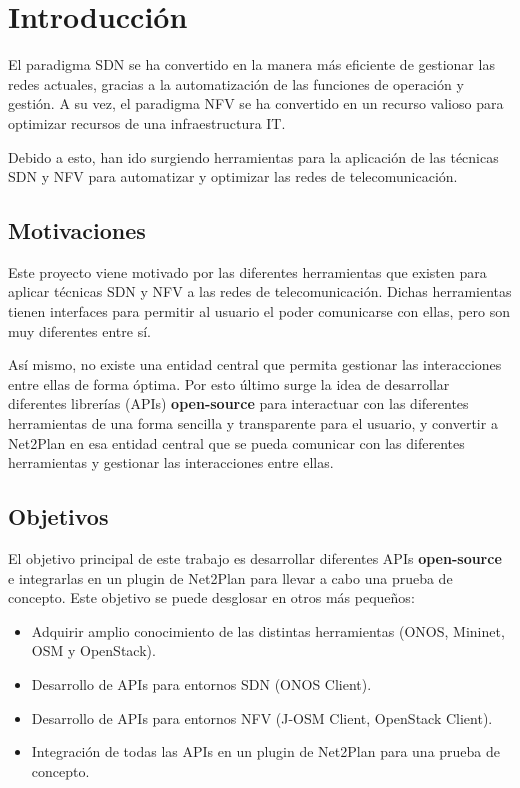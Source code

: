 \chapter{Introducción}

El paradigma SDN se ha convertido en la manera más eficiente de gestionar las redes actuales, gracias a la automatización de las funciones de operación y gestión. A su vez, el paradigma NFV se ha convertido en un recurso valioso para optimizar recursos de una infraestructura IT. 

Debido a esto, han ido surgiendo herramientas para la aplicación de las técnicas SDN y NFV para automatizar y optimizar las redes de telecomunicación.

\section{Motivaciones}

Este proyecto viene motivado por las diferentes herramientas que existen para aplicar técnicas SDN y NFV a las redes de telecomunicación. Dichas herramientas tienen interfaces para permitir al usuario el poder comunicarse con ellas, pero son muy diferentes entre sí. 

Así mismo, no existe una entidad central que permita gestionar las interacciones entre ellas de forma óptima. Por esto último surge la idea de desarrollar diferentes librerías (APIs) \textbf{open-source} para interactuar con las diferentes herramientas de una forma sencilla y transparente para el usuario, y convertir a Net2Plan en esa entidad central que se pueda comunicar con las diferentes herramientas y gestionar las interacciones entre ellas.

\section{Objetivos}

El objetivo principal de este trabajo es desarrollar diferentes APIs \textbf{open-source} e integrarlas en un plugin de Net2Plan para llevar a cabo una prueba de concepto. Este objetivo se puede desglosar en otros más pequeños:

\begin{itemize}
	\item Adquirir amplio conocimiento de las distintas herramientas (ONOS, Mininet, OSM y OpenStack). 
	\item Desarrollo de APIs para entornos SDN (ONOS Client).
	\item Desarrollo de APIs para entornos NFV (J-OSM Client, OpenStack Client).
	\item Integración de todas las APIs en un plugin de Net2Plan para una prueba de concepto.
\end{itemize}

